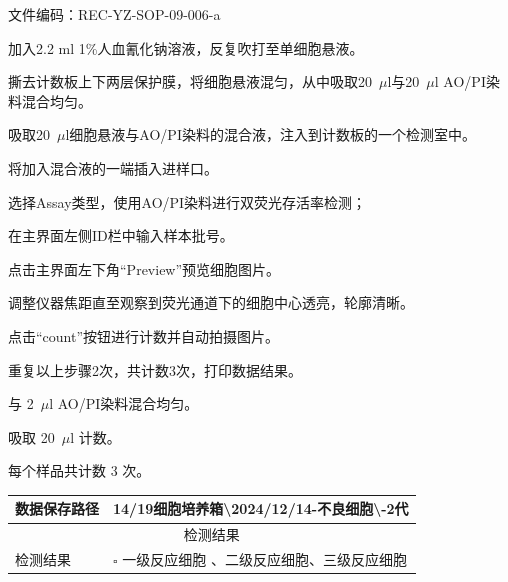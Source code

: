 \documentclass[UTF8,10pt,a4paper,fontset=fandol]{ctexart}
\newcommand{\fieldvalue}[1]{#1}
\newcommand{\handwritten}[1]{#1}
\begin{document}
\noindent
文件编码：REC-YZ-SOP-09-006-a

\begin{minipage}{0.58\textwidth}
加入2.2 ml 1\%人血氰化钠溶液，反复吹打至单细胞悬液。

撕去计数板上下两层保护膜，将细胞悬液混匀，从中吸取20~$\mu$l与20~$\mu$l AO/PI染料混合均匀。

吸取20~$\mu$l细胞悬液与AO/PI染料的混合液，注入到计数板的一个检测室中。

将加入混合液的一端插入进样口。

选择Assay类型，使用AO/PI染料进行双荧光存活率检测；

在主界面左侧ID栏中输入样本批号。

点击主界面左下角“Preview”预览细胞图片。

调整仪器焦距直至观察到荧光通道下的细胞中心透亮，轮廓清晰。

点击“count”按钮进行计数并自动拍摄图片。

重复以上步骤2次，共计数3次，打印数据结果。
\end{minipage}
\hfill
\begin{minipage}{0.36\textwidth}
与
\fieldvalue{\handwritten{2~$\mu$l}}
AO/PI染料混合均匀。

吸取
\fieldvalue{\handwritten{20~$\mu$l}}
计数。

每个样品共计数
\fieldvalue{\handwritten{3}}
次。
\end{minipage}

\noindent
\begin{tabularx}{\textwidth}{|l|X|}
\hline
数据保存路径 &
\fieldvalue{\handwritten{14/19细胞培养箱\textbackslash 2024/12/14-不良细胞\textbackslash -2代}}
\\
\hline
\multicolumn{2}{|c|}{检测结果}\\
\hline
检测结果 &
$\square$
\fieldvalue{一级反应细胞}
、二级反应细胞、三级反应细胞
\\
\hline
\end{tabularx}
\end{document}
